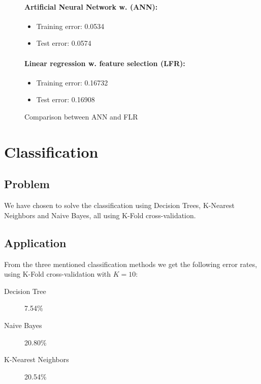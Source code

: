 \documentclass[11pt, paper=a4]{article}
\begin{document}
\begin{figure}[h]
  \begin{minipage}{0.5\textwidth}
    \paragraph{Artificial Neural Network w. (ANN):}
    \begin{itemize}
    \item Training error: 0.0534
    \item Test error:     0.0574
    \end{itemize}
  \end{minipage} \hfill
  \begin{minipage}{0.5\textwidth}
    \paragraph{Linear regression w. feature selection (LFR):}
    \begin{itemize}
    \item Training error: 0.16732
    \item Test error:     0.16908
    \end{itemize}
  \end{minipage} \vfill
  \caption{\label{fig:compare} Comparison between ANN and FLR}
\end{figure}


\clearpage
\section{Classification}

\subsection{Problem}
We have chosen to solve the classification using Decision Trees,
K-Nearest Neighbors and Naive Bayes, all using K-Fold cross-validation.

\subsection{Application}
From the three mentioned classification methods we get the following
error rates, using K-Fold cross-validation with $K=10$:
\begin{description}
  \item[Decision Tree] 7.54\%
  \item[Naive Bayes] 20.80\%
  \item[K-Nearest Neighbors] 20.54\%
\end{description}
\end{document}

